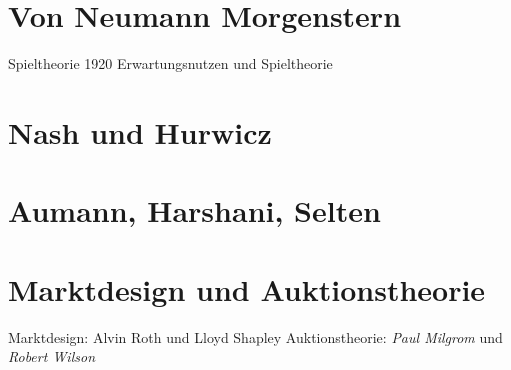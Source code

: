 \section{Von Neumann Morgenstern}
Spieltheorie 1920
Erwartungsnutzen und Spieltheorie


\section{Nash und Hurwicz}

\section{Aumann, Harshani, Selten}

\section{Marktdesign und Auktionstheorie}

Marktdesign: Alvin Roth und Lloyd Shapley 
Auktionstheorie: \textit{Paul Milgrom} und \textit{Robert Wilson}



